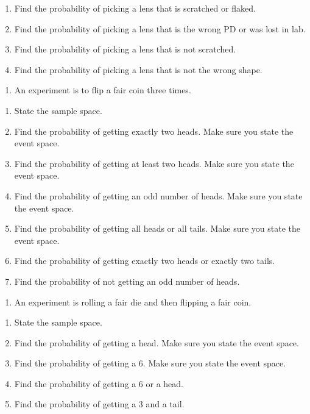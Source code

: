 \documentclass[
]{book}
\providecommand{\tightlist}{%
  \setlength{\itemsep}{0pt}\setlength{\parskip}{0pt}}
\begin{document}
\begin{enumerate}
\def\labelenumi{\alph{enumi}.}
\tightlist
\item
  Find the probability of picking a lens that is scratched or flaked.
\item
  Find the probability of picking a lens that is the wrong PD or was lost in lab.
\item
  Find the probability of picking a lens that is not scratched.
\item
  Find the probability of picking a lens that is not the wrong shape.
\end{enumerate}

\begin{enumerate}
\def\labelenumi{\arabic{enumi}.}
\setcounter{enumi}{2}
\tightlist
\item
  An experiment is to flip a fair coin three times.
\end{enumerate}

\begin{enumerate}
\def\labelenumi{\alph{enumi}.}
\tightlist
\item
  State the sample space.
\item
  Find the probability of getting exactly two heads. Make sure you state the event space.
\item
  Find the probability of getting at least two heads. Make sure you state the event space.
\item
  Find the probability of getting an odd number of heads. Make sure you state the event space.
\item
  Find the probability of getting all heads or all tails. Make sure you state the event space.
\item
  Find the probability of getting exactly two heads or exactly two tails.
\item
  Find the probability of not getting an odd number of heads.
\end{enumerate}

\begin{enumerate}
\def\labelenumi{\arabic{enumi}.}
\setcounter{enumi}{3}
\tightlist
\item
  An experiment is rolling a fair die and then flipping a fair coin.
\end{enumerate}

\begin{enumerate}
\def\labelenumi{\alph{enumi}.}
\tightlist
\item
  State the sample space.
\item
  Find the probability of getting a head. Make sure you state the event space.
\item
  Find the probability of getting a 6. Make sure you state the event space.
\item
  Find the probability of getting a 6 or a head.
\item
  Find the probability of getting a 3 and a tail.
\end{enumerate}
\end{document}
